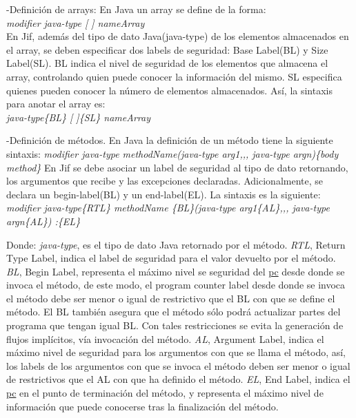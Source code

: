 -Definición de arrays:\newline
En Java un array se define de la forma:\\
\emph{modifier java-type [ ] nameArray}\\
En Jif, además del tipo de dato Java(java-type) de los elementos almacenados en
el array, se deben especificar dos labels de seguridad: Base Label(BL) y Size
Label(SL). BL indica el nivel de seguridad de los elementos que almacena el
array, controlando quien puede conocer la información del mismo. SL especifica
quienes pueden conocer la número de elementos almacenados. Así, la sintaxis para
anotar el array es:\\
\emph{java-type\{BL\} [ ]\{SL\} nameArray}

-Definición de métodos.\newline
En Java la definición de un método tiene la siguiente sintaxis:\newline
\emph{modifier java-type methodName(java-type arg1,,, java-type
argn)\{body method\}}
En Jif se debe asociar un label de seguridad al tipo de dato retornando, los
argumentos que recibe y las excepciones declaradas.
Adicionalmente, se declara un begin-label(BL) y un end-label(EL). La sintaxis es
la siguiente:\newline 
\emph{ modifier java-type\{RTL\} methodName \{BL\}(java-type arg1\{AL\},,,
java-type argn\{AL\}) :\{EL\} }

Donde: \emph{java-type}, es el tipo de dato Java retornado por el
método.\newline 
\emph{RTL}, Return Type Label, indica el label de seguridad para el valor
devuelto por el método.\newline 
\emph{BL}, Begin Label, representa el máximo nivel se seguridad del
\underline{pc} desde donde se invoca el método, de este modo,
el program counter label desde donde se invoca el método debe ser menor o igual
de restrictivo que el BL con que se define el método. El BL también asegura que
el método sólo podrá actualizar partes del programa que tengan igual BL. Con
tales restricciones se evita la generación de flujos implícitos, vía invocación
del método.\newline
\emph{AL}, Argument Label, indica el máximo nivel de seguridad para los
argumentos con que se llama el método, así, los labels de los argumentos con que se
invoca el método deben ser menor o igual de restrictivos que el AL con que ha
definido el método.\newline 
\emph{EL}, End Label, indica el \underline{pc} en el punto de terminación del
método, y representa el máximo nivel de información que puede conocerse tras la
finalización del método.

